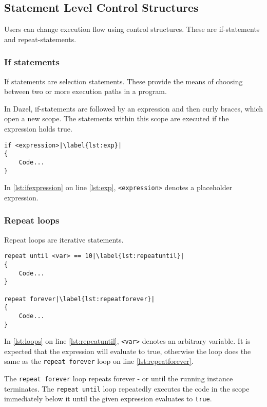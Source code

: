 \subsection{Statement Level Control Structures}
Users can change execution flow using control structures. These are if-statements and repeat-statements.
\subsubsection{If statements}
If statements are selection statements. These provide the means of choosing between two or more execution paths in a program\cite{sebesta_concepts_2016}.

In Dazel, if-statements are followed by an expression and then curly braces, which open a new scope. The statements within this scope are executed if the expression holds true.

\begin{lstlisting}[caption={Example of an if statement}, label={lst:ifexpression},escapechar=|]
if <expression>|\label{lst:exp}|
{
    Code...
}
\end{lstlisting}

In \ref{lst:ifexpression} on line \ref{lst:exp},  \verb|<expression>| denotes a placeholder expression.

\subsubsection{Repeat loops}
Repeat loops are iterative statements.

\begin{lstlisting}[caption={Example of loops}, label={lst:loops},escapechar=|]
repeat until <var> == 10|\label{lst:repeatuntil}|
{
    Code...
}

repeat forever|\label{lst:repeatforever}|
{
    Code...
}
\end{lstlisting}

In \ref{lst:loops} on line \ref{lst:repeatuntil}, \verb|<var>| denotes an arbitrary variable. It is expected that the expression will evaluate to true, otherwise the loop does the same as the \verb|repeat forever| loop on line \ref{lst:repeatforever}.

The \verb|repeat forever| loop repeats forever - or until the running instance terminates.
The \verb|repeat until| loop repeatedly executes the code in the scope immediately below it until the given expression evaluates to \verb|true|.
